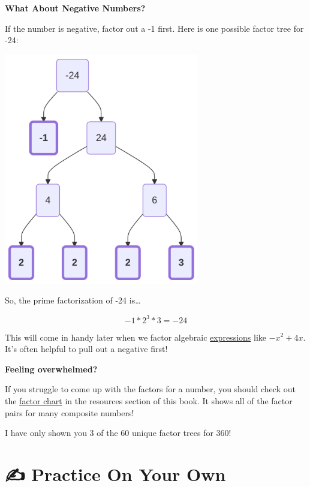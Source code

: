 \documentclass[
  letterpaper,
  DIV=11,
  numbers=noendperiod]{scrreprt}
\begin{document}
\textbf{What About Negative Numbers?}

If the number is negative, factor out a -1 first. Here is one possible
factor tree for -24:

\label{mermaid-diagram}
\includegraphics[width=3.35in,height=3.98in]{chapters/Unit_1/1.2_Factors_Multiples_&_Prime_Factorization_files/figure-latex/mermaid-figure-4.png}

So, the prime factorization of -24 is\ldots{}

\[-1 * 2^3 * 3 = -24\]

This will come in handy later when we factor algebraic
\href{./glossary.html\#glossary-expression}{expressions} like
\(-x^2 + 4x\). It's often helpful to pull out a negative first!

\textbf{Feeling overwhelmed?}

If you struggle to come up with the factors for a number, you should
check out the \href{./resources/Factor-Chart_noprimes.pdf}{factor chart}
in the resources section of this book. It shows all of the factor pairs
for many composite numbers!

I have only shown you 3 of the 60 unique factor trees for 360!

\section*{✍️ Practice On Your Own}\label{practice-on-your-own-1}

\end{document}
